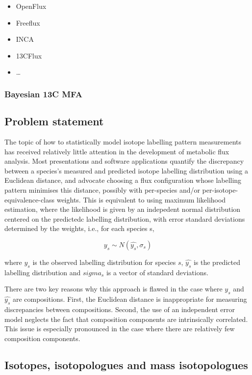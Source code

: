 \documentclass{article}
\def\tightlist{}
\begin{document}
\begin{itemize}
\tightlist
\item
  OpenFlux
\item
  Freeflux
\item
  INCA
\item
  13CFlux
\item
  \ldots{}
\end{itemize}

\subsubsection{Bayesian 13C MFA}\label{bayesian-13c-mfa}

\subsection{Problem statement}\label{problem-statement}

The topic of how to statistically model isotope labelling pattern
measurements has received relatively little attention in the development
of metabolic flux analysis. Most presentations and software applications
quantify the discrepancy between a species's measured and predicted
isotope labelling distribution using a Euclidean distance, and advocate
choosing a flux configuration whose labelling pattern minimises this
distance, possibly with per-species and/or per-isotope-equivalence-class
weights. This is equivalent to using maximum likelihood estimation,
where the likelihood is given by an indepedent normal distribution
centered on the predictedc labelling distribution, with error standard
deviations determined by the weights, i.e., for each species s,

\[
y_s \sim N(\hat{y_s}, \sigma_s)
\]

where \(y_s\) is the observed labelling distribution for species \(s\),
\(\hat{y_s}\) is the predicted labelling distribution and \(sigma_s\) is
a vector of standard deviations.

There are two key reasons why this approach is flawed in the case where
\(y_s\) and \(\hat{y_s}\) are compositions. First, the Euclidean
distance is inappropriate for measuring discrepancies between
compositions. Second, the use of an independent error model neglects the
fact that composition components are intrinsically correlated. This
issue is especially pronounced in the case where there are relatively
few composition components.

\subsection{Isotopes, isotopologues and mass
isotopologues}\label{isotopes-isotopologues-and-mass-isotopologues}
\end{document}
